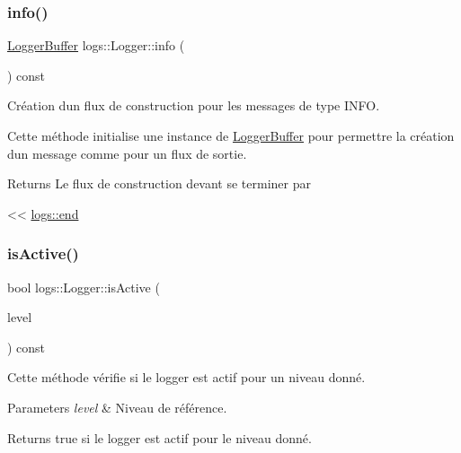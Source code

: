 \subsubsection{\texorpdfstring{info()}{info()}\hspace{0.1cm}{\footnotesize\ttfamily [2/2]}}
{\footnotesize\ttfamily \hyperlink{classlogs_1_1Logger_1_1LoggerBuffer}{Logger\+Buffer} logs\+::\+Logger\+::info (\begin{DoxyParamCaption}{ }\end{DoxyParamCaption}) const\hspace{0.3cm}{\ttfamily [inline]}}



Création d\textquotesingle{}un flux de construction pour les messages de type I\+N\+FO. 

Cette méthode initialise une instance de {\ttfamily \hyperlink{classlogs_1_1Logger_1_1LoggerBuffer}{Logger\+Buffer}} pour permettre la création d\textquotesingle{}un message comme pour un flux de sortie.

\begin{DoxyReturn}{Returns}
Le flux de construction devant se terminer par
\begin{DoxyCode}
<< \hyperlink{Logger_8hpp_ac6f325c6cfe6189bc8e243daa184453b}{logs::end} 
\end{DoxyCode}
 
\end{DoxyReturn}
\mbox{\label{classlogs_1_1Logger_a13e5a43ff9ecfe978afcd4443be1b32b}} 
\subsubsection{\texorpdfstring{is\+Active()}{isActive()}}
{\footnotesize\ttfamily bool logs\+::\+Logger\+::is\+Active (\begin{DoxyParamCaption}\item[{const \hyperlink{classlogs_1_1Level}{logs\+::\+Level} \&}]{level }\end{DoxyParamCaption}) const\hspace{0.3cm}{\ttfamily [inline]}}



Cette méthode vérifie si le logger est actif pour un niveau donné. 


\begin{DoxyParams}{Parameters}
{\em level} & Niveau de référence. \\
\hline
\end{DoxyParams}
\begin{DoxyReturn}{Returns}
{\ttfamily true} si le logger est actif pour le niveau donné. 
\end{DoxyReturn}
\mbox{\label{classlogs_1_1Logger_ae55afdeeb1bc9acb6dc02a3e2d06062f}} 
